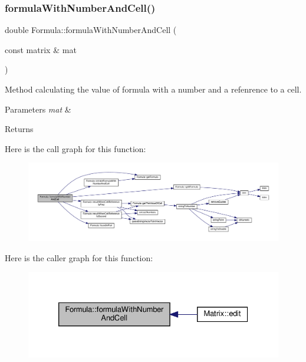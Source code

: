 \subsubsection{\texorpdfstring{formula\+With\+Number\+And\+Cell()}{formulaWithNumberAndCell()}}
{\footnotesize\ttfamily double Formula\+::formula\+With\+Number\+And\+Cell (\begin{DoxyParamCaption}\item[{const matrix \&}]{mat }\end{DoxyParamCaption})}

Method calculating the value of formula with a number and a refenrence to a cell. 
\begin{DoxyParams}{Parameters}
{\em mat} & \\
\hline
\end{DoxyParams}
\begin{DoxyReturn}{Returns}

\end{DoxyReturn}
Here is the call graph for this function\+:\nopagebreak
\begin{figure}[H]
\begin{center}
\leavevmode
\includegraphics[width=350pt]{class_formula_a0f831b2ee98fbeb7df371f83ee7d374d_cgraph}
\end{center}
\end{figure}
Here is the caller graph for this function\+:\nopagebreak
\begin{figure}[H]
\begin{center}
\leavevmode
\includegraphics[width=326pt]{class_formula_a0f831b2ee98fbeb7df371f83ee7d374d_icgraph}
\end{center}
\end{figure}
\mbox{\label{class_formula_a518bc97bd50f1cc5573be7d3f8cb6253}} 
